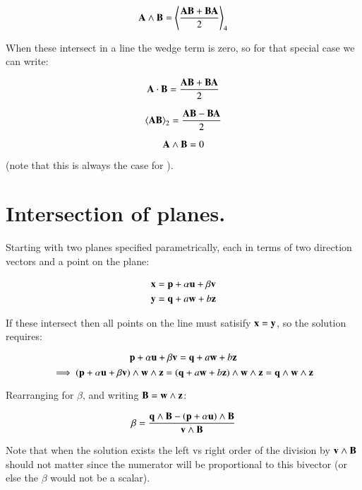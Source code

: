 \documentclass{article}      %
\newcommand{\gpgrade}[2] {{\left\langle{{#1}}\right\rangle}_{#2}}
\newcommand{\gpgradetwo}[1] {\gpgrade{#1}{2}}
\begin{document}
\begin{equation}\label{eqn:AwedgeB}
\BA \wedge \BB = \gpgrade{\frac{\BA \BB + \BB\BA}{2}}{4}
\end{equation}

When these intersect in a line the wedge term is zero, so for that special case we can write:

\begin{equation*}
\mathbf{A} \cdot \mathbf{B} = \frac{\mathbf{A} \mathbf{B} + \mathbf{B}\mathbf{A}}{2}
\end{equation*}

\begin{equation*}
\gpgradetwo{\BA \BB} = \frac{\BA \BB - \BB\BA}{2}
\end{equation*}

\begin{equation*}
\mathbf{A} \wedge \mathbf{B} = 0
\end{equation*}

(note that this is always the case for ).

\section{ Intersection of planes. }

Starting with two planes specified parametrically, each in terms of two direction vectors and a point on the plane:

\begin{align}
\mathbf{x} &= \mathbf{p} + \alpha \mathbf{u} + \beta \mathbf{v} \label{eqn:firstplane} \\
\mathbf{y} &= \mathbf{q} + a \mathbf{w} + b \mathbf{z} \label{eqn:secondplane} \\
\end{align}

If these intersect then all points on the line must satisify $\mathbf{x} = \mathbf{y}$, so the
solution requires:

\[
\mathbf{p} + \alpha \mathbf{u} + \beta \mathbf{v} = \mathbf{q} + a \mathbf{w} + b \mathbf{z}
\]
\[
\implies
(\mathbf{p} + \alpha \mathbf{u} + \beta \mathbf{v}) \wedge \mathbf{w} \wedge \mathbf{z} = (\mathbf{q} + a \mathbf{w} + b \mathbf{z}) \wedge \mathbf{w} \wedge \mathbf{z} = \mathbf{q} \wedge \mathbf{w} \wedge \mathbf{z}
\]

Rearranging for $\beta$, and writing $\mathbf{B} = \mathbf{w} \wedge \mathbf{z}$:

\[
\beta = \frac{\mathbf{q} \wedge \mathbf{B} - (\mathbf{p} + \alpha \mathbf{u}) \wedge \mathbf{B}}{\mathbf{v} \wedge \mathbf{B}}
\]

Note that when the solution exists the left vs right order of the division by $\mathbf{v} \wedge \mathbf{B}$ should not matter since the numerator will be proportional to this bivector (or else the $\beta$ would not be a scalar).
\end{document}
